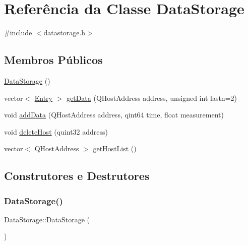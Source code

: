 \hypertarget{class_data_storage}{}\section{Referência da Classe Data\+Storage}
\label{class_data_storage}


{\ttfamily \#include $<$datastorage.\+h$>$}

\subsection*{Membros Públicos}
\begin{DoxyCompactItemize}
\item 
\mbox{\hyperlink{class_data_storage_a22825d40495dae6a5df46d629fb26a3f}{Data\+Storage}} ()
\item 
vector$<$ \mbox{\hyperlink{struct_entry}{Entry}} $>$ \mbox{\hyperlink{class_data_storage_a716fe9bd808cb8ea9f0ef153bf01a633}{get\+Data}} (Q\+Host\+Address address, unsigned int lastn=2)
\item 
void \mbox{\hyperlink{class_data_storage_ab46b18762db5b17b3e0a97150079cb78}{add\+Data}} (Q\+Host\+Address address, qint64 time, float measurement)
\item 
void \mbox{\hyperlink{class_data_storage_a6d1d74566ca198c807a9dbbb16019472}{delete\+Host}} (quint32 address)
\item 
vector$<$ Q\+Host\+Address $>$ \mbox{\hyperlink{class_data_storage_a05e60f4e62fb68f588e3f381d40b6bbd}{get\+Host\+List}} ()
\end{DoxyCompactItemize}


\subsection{Construtores e Destrutores}
\mbox{\label{class_data_storage_a22825d40495dae6a5df46d629fb26a3f}} 
\subsubsection{\texorpdfstring{Data\+Storage()}{DataStorage()}}
{\footnotesize\ttfamily Data\+Storage\+::\+Data\+Storage (\begin{DoxyParamCaption}{ }\end{DoxyParamCaption})}


